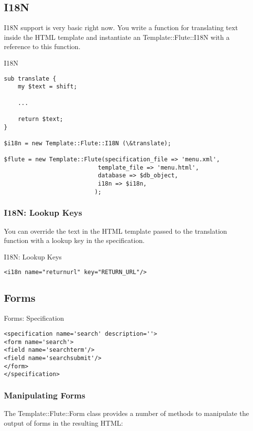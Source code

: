 \subsection{I18N}
I18N support is very basic right now. You write a function for
translating text inside the HTML template and instantiate an
Template::Flute::I18N with a reference to this function. 
\begin{frame}[fragile]{I18N}
\begin{lstlisting}
sub translate {
    my $text = shift;

    ...

    return $text;
}

$i18n = new Template::Flute::I18N (\&translate);

$flute = new Template::Flute(specification_file => 'menu.xml',
						   template_file => 'menu.html',
						   database => $db_object,
						   i18n => $i18n,
						  );
\end{lstlisting}
\end{frame}

\subsubsection{I18N: Lookup Keys}
You can override the text in the HTML template passed to the
translation function with a lookup key in the specification.
\begin{frame}[fragile]{I18N: Lookup Keys}
\begin{lstlisting}
<i18n name="returnurl" key="RETURN_URL"/>
\end{lstlisting}
\end{frame}

\subsection{Forms}
\begin{frame}[fragile]{Forms: Specification}
\begin{lstlisting}
<specification name='search' description=''>
<form name='search'>
<field name='searchterm'/>
<field name='searchsubmit'/>
</form>
</specification>
\end{lstlisting}
\end{frame}

\subsubsection{Manipulating Forms}
The Template::Flute::Form class provides a number of methods
to manipulate the output of forms in the resulting HTML:

